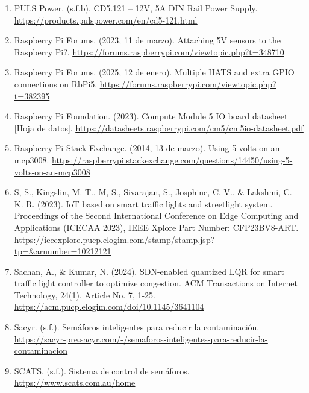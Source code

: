 \begin{enumerate}
\item
  PULS Power. (s.f.b). CD5.121 -- 12V, 5A DIN Rail Power Supply. \href{https://products.pulspower.com/en/cd5-121.html}{\ul{https://products.pulspower.com/en/cd5-121.html}}
\item
  Raspberry Pi Forums. (2023, 11 de marzo). Attaching 5V sensors to the Raspberry Pi?. \href{https://forums.raspberrypi.com/viewtopic.php?t=348710}{\ul{https://forums.raspberrypi.com/viewtopic.php?t=348710}}
\item
  Raspberry Pi Forums. (2025, 12 de enero). Multiple HATS and extra GPIO connections on RbPi5. \href{https://forums.raspberrypi.com/viewtopic.php?t=382395}{\ul{https://forums.raspberrypi.com/viewtopic.php?t=382395}}
\item
  Raspberry Pi Foundation. (2023). Compute Module 5 IO board datasheet {[}Hoja de datos{]}. \href{https://datasheets.raspberrypi.com/cm5/cm5io-datasheet.pdf}{\ul{https://datasheets.raspberrypi.com/cm5/cm5io-datasheet.pdf}}
\item
  Raspberry Pi Stack Exchange. (2014, 13 de marzo). Using 5 volts on an mcp3008. \href{https://raspberrypi.stackexchange.com/questions/14450/using-5-volts-on-an-mcp3008}{\ul{https://raspberrypi.stackexchange.com/questions/14450/using-5-volts-on-an-mcp3008}}
\item
  S, S., Kingslin, M. T., M, S., Sivarajan, S., Josphine, C. V., \& Lakshmi, C. K. R. (2023). IoT based on smart traffic lights and streetlight system. Proceedings of the Second International Conference on Edge Computing and Applications (ICECAA 2023), IEEE Xplore Part Number: CFP23BV8-ART. \href{https://ieeexplore.pucp.elogim.com/stamp/stamp.jsp?tp=&arnumber=10212121}{\ul{https://ieeexplore.pucp.elogim.com/stamp/stamp.jsp?tp=\&arnumber=10212121}}
\item
  Sachan, A., \& Kumar, N. (2024). SDN-enabled quantized LQR for smart traffic light controller to optimize congestion. ACM Transactions on Internet Technology, 24(1), Article No. 7, 1-25. \href{https://acm.pucp.elogim.com/doi/10.1145/3641104}{\ul{https://acm.pucp.elogim.com/doi/10.1145/3641104}}
\item
  Sacyr. (s.f.). Semáforos inteligentes para reducir la contaminación. \href{https://sacyr-pre.sacyr.com/-/semaforos-inteligentes-para-reducir-la-contaminacion}{\ul{https://sacyr-pre.sacyr.com/-/semaforos-inteligentes-para-reducir-la-contaminacion}}
\item
  SCATS. (s.f.). Sistema de control de semáforos. \href{https://www.scats.com.au/home}{\ul{https://www.scats.com.au/home}}

\end{enumerate}
